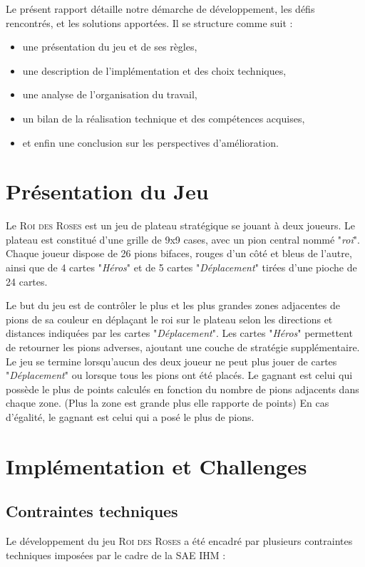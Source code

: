 Le présent rapport détaille notre démarche de développement, les défis rencontrés, et les solutions apportées. Il se structure comme suit :
\begin{itemize}
    \item une présentation du jeu et de ses règles,
    \item une description de l'implémentation et des choix techniques,
    \item une analyse de l'organisation du travail,
    \item un bilan de la réalisation technique et des compétences acquises,
    \item et enfin une conclusion sur les perspectives d'amélioration.
\end{itemize}

\section{Présentation du Jeu}

Le \textsc{Roi des Roses} est un jeu de plateau stratégique se jouant à deux joueurs.
Le plateau est constitué d'une grille de 9x9 cases, avec un pion central nommé "\emph{roi}".
Chaque joueur dispose de 26 pions bifaces, rouges d'un côté et bleus de l'autre, ainsi que de 4 cartes "\emph{Héros}" et de 5 cartes "\emph{Déplacement}" tirées d'une pioche de 24 cartes.

Le but du jeu est de contrôler le plus et les plus grandes zones adjacentes de pions de sa couleur en déplaçant le roi sur le plateau selon les directions et distances indiquées par les cartes "\emph{Déplacement}".
Les cartes "\emph{Héros}" permettent de retourner les pions adverses, ajoutant une couche de stratégie supplémentaire.
Le jeu se termine lorsqu'aucun des deux joueur ne peut plus jouer de cartes "\emph{Déplacement}" ou lorsque tous les pions ont été placés.
Le gagnant est celui qui possède le plus de points calculés en fonction du nombre de pions adjacents dans chaque zone. (Plus la zone est grande plus elle rapporte de points)
En cas d’égalité, le gagnant est celui qui a posé le plus de pions.

\section{Implémentation et Challenges}

\subsection{Contraintes techniques}
Le développement du jeu \textsc{Roi des Roses} a été encadré par plusieurs contraintes techniques imposées par le cadre de la SAE IHM :
